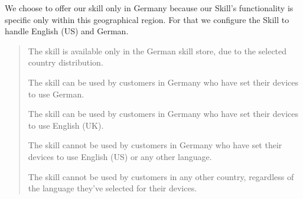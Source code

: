 We choose to offer our skill only in Germany because our Skill's functionality is specific only within this geographical region. For that we configure the Skill to handle English (US) and German.

\begin{quotation}

\item The skill is available only in the German skill store, due to the selected country distribution.
\item The skill can be used by customers in Germany who have set their devices to use German.
\item The skill can be used by customers in Germany who have set their devices to use English (UK).
\item The skill cannot be used by customers in Germany who have set their devices to use English (US) or any other language.
\item The skill cannot be used by customers in any other country, regardless of the language they've selected for their devices.

\end{quotation}








 



